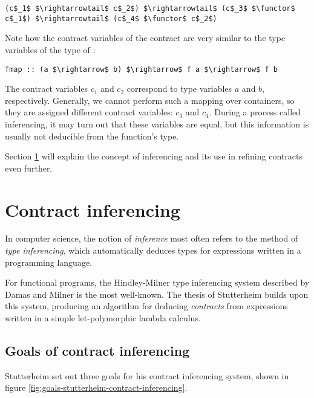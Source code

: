 \documentclass[10pt]{report}
\makeatletter
\newcommand{\functor}{<\!\!\!@\!\!\!>}
\newcommand{\code}[1]{%
  {%
   \setlength{\fboxsep}{-2\fboxrule}%
   \fcolorbox{black}{light-gray}{\hspace{1.5pt}\strut\texttt{#1}\hspace{1.5pt}}%
  }%
}
\makeatother
\begin{document}
\begin{lstlisting}[mathescape]
(c$_1$ $\rightarrowtail$ c$_2$) $\rightarrowtail$ (c$_3$ $\functor$ c$_1$) $\rightarrowtail$ (c$_4$ $\functor$ c$_2$)
\end{lstlisting}

Note how the contract variables of the contract are very similar to the type variables of the type of \code{fmap}:

\begin{lstlisting}[mathescape]
fmap :: (a $\rightarrow$ b) $\rightarrow$ f a $\rightarrow$ f b
\end{lstlisting}

The contract variables $c_1$ and $c_2$ correspond to type variables $a$ and $b$, respectively.
Generally, we cannot perform such a mapping over containers, so they are assigned different contract variables: $c_3$ and $c_4$.
During a process called inferencing, it may turn out that these variables are equal, but this information is usually not deducible from the function's type.

Section \ref{background-inferencing} will explain the concept of inferencing and its use in refining contracts even further.

\section{Contract inferencing}
\label{background-inferencing}

In computer science, the notion of \textit{inference} most often refers to the method of \textit{type inferencing}, which automatically deduces types for expressions written in a programming language.

For functional programs, the Hindley-Milner type inferencing system described by Damas and Milner \cite{Damas:1982ve} is the most well-known.
The thesis of Stutterheim \cite{Stutterheim:2013:thesis} builds upon this system, producing an algorithm for deducing \textit{contracts} from expressions written in a simple let-polymorphic lambda calculus.

\subsection{Goals of contract inferencing}
Stutterheim set out three goals for his contract inferencing system, shown in figure \ref{fig:goals-stutterheim-contract-inferencing}.
\end{document}
